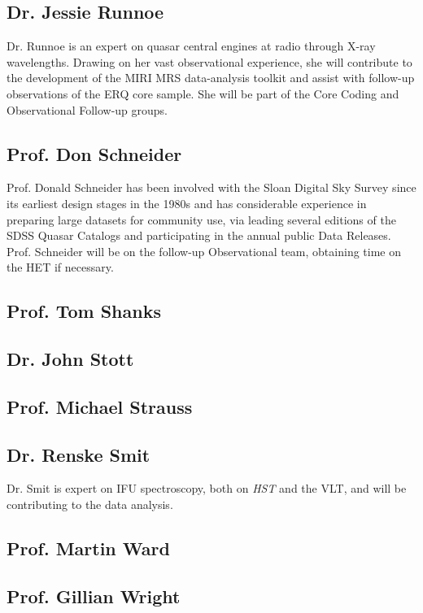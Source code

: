 \subsection*{Dr. Jessie Runnoe}
Dr. Runnoe is an expert on quasar central engines at radio through
X-ray wavelengths.  Drawing on her vast observational experience, she
will contribute to the development of the MIRI MRS data-analysis
toolkit and assist with follow-up observations of the ERQ core sample.
She will be part of the Core Coding and Observational Follow-up
groups.

\subsection*{Prof. Don Schneider}
Prof. Donald Schneider has been involved with the Sloan Digital Sky
Survey since its earliest design stages in the 1980s and has
considerable experience in preparing large datasets for community use,
via leading several editions of the SDSS Quasar Catalogs and
participating in the annual public Data Releases. Prof. Schneider will
be on the follow-up Observational team, obtaining time on the HET if
necessary.


\subsection*{Prof. Tom Shanks}	


\subsection*{Dr. John Stott}


\subsection*{Prof. Michael  Strauss}


\subsection*{Dr. Renske Smit}		
Dr. Smit is expert on IFU spectroscopy, both on {\it HST} and the VLT,
and will be contributing to the data analysis.


\subsection*{Prof. Martin Ward}		


\subsection*{Prof. Gillian Wright}



